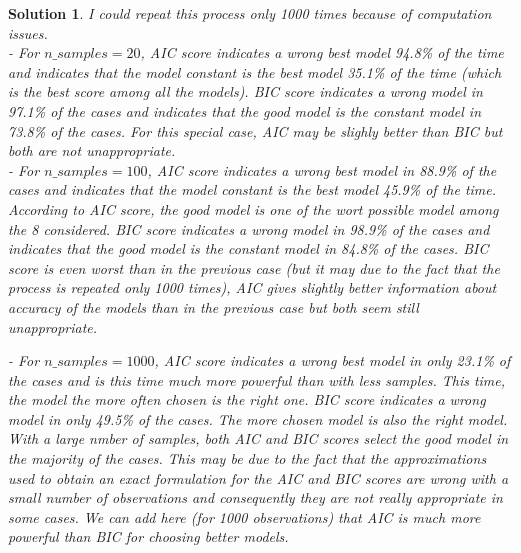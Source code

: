 \documentclass[12pt,a4paper]{article}
\newtheorem{solution}{Solution}
\begin{document}
\begin{solution}
I could repeat this process only 1000 times because of computation issues. \\
- For $n\_samples = 20$, AIC score indicates a wrong best model 94.8\% of the time and indicates that the model constant is the best model 35.1\% of the time (which is the best score among all the models). BIC score indicates a wrong model in 97.1\% of the cases and indicates that the good model is the constant model in 73.8\% of the cases. For this special case, AIC may be slighly better than BIC but both are not unappropriate. \\

- For $n\_samples = 100$, AIC score indicates a wrong best model in 88.9\% of the cases and indicates that the model constant is the best model 45.9\% of the time. According to AIC score, the good model is one of the wort possible model among the 8 considered.  BIC score indicates a wrong model in 98.9\% of the cases and indicates that the good model is the constant model in 84.8\% of the cases. BIC score is even worst than in the previous case (but it may due to the fact that the process is repeated only 1000 times), AIC gives slightly better information about accuracy of the models than in the previous case but both seem still unappropriate.

- For $n\_samples = 1000$, AIC score indicates a wrong best model in only 23.1\% of the cases and is this time much more powerful than with less samples. This time, the model the more often chosen is the right one.  BIC score indicates a wrong model in only 49.5\% of the cases. The more chosen model is also the right model. With a large nmber of samples, both AIC and BIC scores select the good model in the majority of the cases. This may be due to the fact that the approximations used to obtain an exact formulation for the AIC and BIC scores are wrong with a small number of observations and consequently they are not really appropriate in some cases. We can add here (for 1000 observations) that AIC is much more powerful than BIC for choosing better models.


\end{solution}
\end{document}
